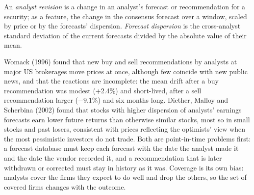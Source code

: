 \begin{omfigure}

\label{fig:rs:fundamental-analyst-and-event-features:ic}
\end{omfigure}

\begin{definition}\label{def:rs:fundamental-analyst-and-event-features:revision}
An \emph{analyst revision} is a change in an analyst's forecast or recommendation for a security; as a feature, the
change in the consensus forecast over a window, scaled by price or by the forecasts' dispersion. \emph{Forecast
dispersion} is the cross-analyst standard deviation of the current forecasts divided by the absolute value of their
mean.
\end{definition}

Womack (1996) found that new buy and sell recommendations by analysts at major US brokerages move prices at once, although few coincide
with new public news, and that the reactions are incomplete: the mean drift after a buy recommendation was modest (+2.4\%) and short-lived,
after a sell recommendation larger ($-9.1\%$) and six months long. Diether, Malloy and Scherbina (2002) found that stocks with higher dispersion
of analysts' earnings forecasts earn lower future returns than otherwise similar stocks, most so in small stocks and past losers, consistent
with prices reflecting the optimists' view when the most pessimistic investors do not trade. Both are point-in-time problems first: a
forecast database must keep each forecast with the date the analyst made it and the date the vendor recorded it, and a recommendation that
is later withdrawn or corrected must stay in history as it was. Coverage is its own bias: analysts cover the firms they expect to do well
and drop the others, so the set of covered firms changes with the outcome.

